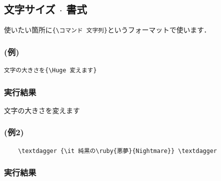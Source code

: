 \documentclass[a4j, titlepage]{jarticle}
\begin{document}
\subsection{文字サイズ $\cdot$ 書式}
使いたい箇所に\verb|{\コマンド 文字列}|というフォーマットで使います．

\begin{multicols}{2}
\subsubsection*{(例)}
\begin{lstlisting}
文字の大きさを{\Huge 変えます}
\end{lstlisting}

\vfill\null
\columnbreak

\subsubsection*{実行結果}
\begin{screen}

    文字の大きさを{\Huge 変えます}

\end{screen}
\end{multicols}


    \subsubsection*{(例2)}
    \begin{lstlisting}
    \textdagger {\it 純黒の\ruby{悪夢}{Nightmare}} \textdagger
    \end{lstlisting}

    \subsubsection*{実行結果}
    \begin{screen}

         \textdagger

    \end{screen}
\end{document}
